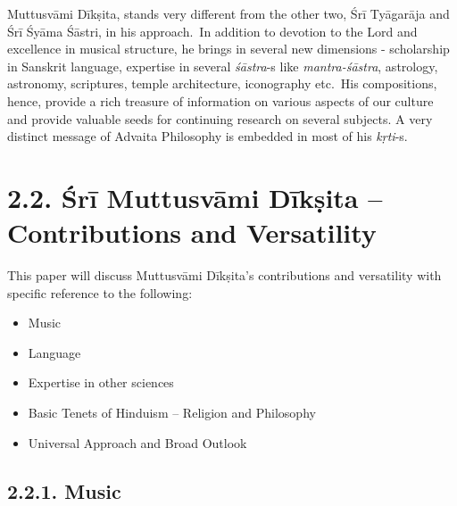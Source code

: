 Muttusvāmi Dīkṣita, stands very different from the other two, Śrī Tyāgarāja and Śrī Śyāma Śāstri, in his approach.~In addition to devotion to the Lord and excellence in musical structure, he brings in several new dimensions - scholarship in Sanskrit language, expertise in several \textit{śāstra}-s like \textit{mantra-śāstra}, astrology, astronomy, scriptures, temple architecture, iconography etc.~His compositions, hence, provide a rich treasure of information on various aspects of our culture and provide valuable seeds for continuing research on several subjects. A very distinct message of Advaita Philosophy is embedded in most of his \textit{kṛti}-s.


\section*{2.2. Śrī Muttusvāmi Dīkṣita – Contributions and Versatility}

This paper will discuss Muttusvāmi Dīkṣita’s contributions and versatility with specific reference to the following:

\vspace{-.3cm}

\begin{itemize}
\itemsep=0pt

 \item Music

 \item Language

 \item Expertise in other sciences

 \item Basic Tenets of Hinduism – Religion and Philosophy

 \item Universal Approach and Broad Outlook

\end{itemize}

\vspace{-.4cm}

\subsection*{2.2.1. Music}

